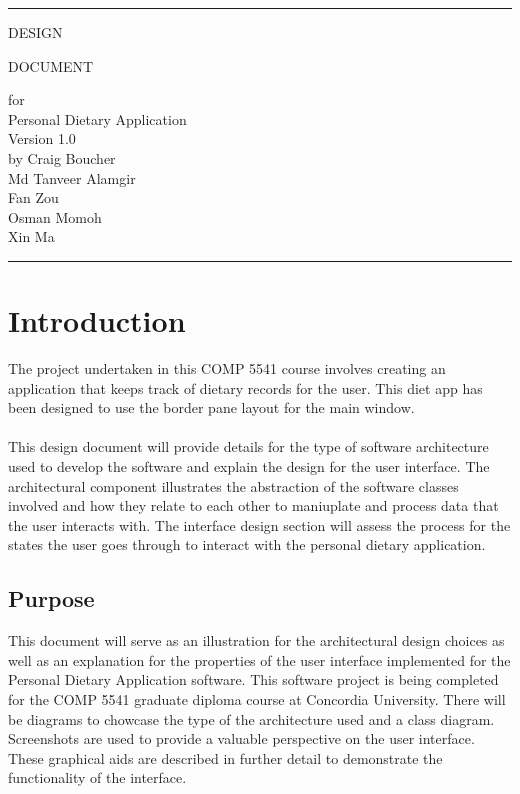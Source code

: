 \documentclass{scrreprt}
\date{}
\def\myversion{1.0}
\begin{document}
\begin{titlepage}
  \flushright\bfseries\huge
    \rule{\linewidth}{5pt}
    \par
    \vspace{1cm}
    {\Huge DESIGN \par DOCUMENT \par}
    \vspace{2cm}
    for \\
    \vspace{2cm}
    Personal Dietary Application \\
    \vspace{2cm}
     \LARGE{Version \myversion \\}
    \vspace{2cm}
    by Craig Boucher \\
    Md Tanveer Alamgir \\
    Fan Zou\\
    Osman Momoh \\
    Xin Ma
    \vspace{2cm}
    \rule{\linewidth}{5pt}
\end{titlepage}
\tableofcontents
\chapter{Introduction}
The project undertaken in this COMP 5541 course involves creating an application that keeps track of dietary records for the user. This diet app has been designed to use the border pane layout for the main window. \\ \\ 
This design document will provide details for the type of software architecture used to develop the software and explain the design for the user interface. The architectural component illustrates the abstraction of the software classes involved and how they relate to each other to maniuplate and process data that the user interacts with. The interface design section will assess the process for the states the user goes through to interact with the personal dietary application.
\section{Purpose}
This document will serve as an illustration for the architectural design choices as well as an explanation for the properties of the user interface implemented for the Personal Dietary Application software. This software project is being completed for the COMP 5541 graduate diploma course at Concordia University. There will be diagrams to chowcase the type of the architecture used and a class diagram. Screenshots are used to provide a valuable perspective on the user interface. These graphical aids are described in further detail to demonstrate the functionality of the interface.
\end{document}
